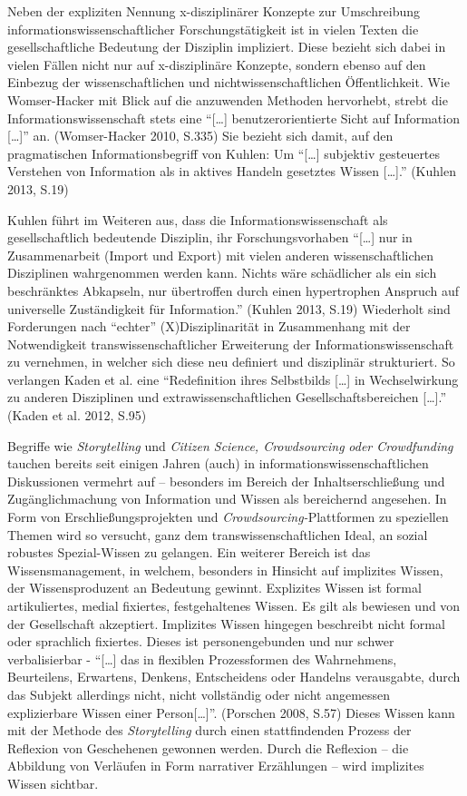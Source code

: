 \documentclass[a4paper,
fontsize=11pt,
oneside,
numbers=noperiodatend,
parskip=half-,
bibliography=totoc,
final
]{scrartcl}
\begin{document}
Neben der expliziten Nennung x-disziplinärer Konzepte zur Umschreibung
informationswissenschaftlicher Forschungstätigkeit ist in vielen Texten
die gesellschaftliche Bedeutung der Disziplin impliziert. Diese bezieht
sich dabei in vielen Fällen nicht nur auf x-disziplinäre Konzepte,
sondern ebenso auf den Einbezug der wissenschaftlichen und
nichtwissenschaftlichen Öffentlichkeit. Wie Womser-Hacker mit Blick auf
die anzuwenden Methoden hervorhebt, strebt die Informationswissenschaft
stets eine \enquote{{[}\ldots{}{]} benutzerorientierte Sicht auf
Information {[}\ldots{}{]}} an. (Womser-Hacker 2010, S.335) Sie bezieht
sich damit, auf den pragmatischen Informationsbegriff von Kuhlen: Um
\enquote{{[}\ldots{}{]} subjektiv gesteuertes Verstehen von Information
als in aktives Handeln gesetztes Wissen {[}\ldots{}{]}.} (Kuhlen 2013,
S.19)

Kuhlen führt im Weiteren aus, dass die Informationswissenschaft als
gesellschaftlich bedeutende Disziplin, ihr Forschungsvorhaben
\enquote{{[}\ldots{}{]} nur in Zusammenarbeit (Import und Export) mit
vielen anderen wissenschaftlichen Disziplinen wahrgenommen werden kann.
Nichts wäre schädlicher als ein sich beschränktes Abkapseln, nur
übertroffen durch einen hypertrophen Anspruch auf universelle
Zuständigkeit für Information.} (Kuhlen 2013, S.19) Wiederholt sind
Forderungen nach \enquote{echter} (X)Disziplinarität in Zusammenhang mit
der Notwendigkeit transwissenschaftlicher Erweiterung der
Informationswissenschaft zu vernehmen, in welcher sich diese neu
definiert und disziplinär strukturiert. So verlangen Kaden et al. eine
\enquote{Redefinition ihres Selbstbilds {[}\ldots{}{]} in Wechselwirkung
zu anderen Disziplinen und extrawissenschaftlichen
Gesellschaftsbereichen {[}\ldots{}{]}.} (Kaden et al. 2012, S.95)

Begriffe wie \emph{Storytelling} und \emph{Citizen Science,
Crowdsourcing} \emph{oder Crowdfunding} tauchen bereits seit einigen
Jahren (auch) in informationswissenschaftlichen Diskussionen vermehrt
auf -- besonders im Bereich der Inhaltserschließung und
Zugänglichmachung von Information und Wissen als bereichernd angesehen.
In Form von Erschließungsprojekten und \emph{Crowdsourcing-}Plattformen
zu speziellen Themen wird so versucht, ganz dem transwissenschaftlichen
Ideal, an sozial robustes Spezial-Wissen zu gelangen. Ein weiterer
Bereich ist das Wissensmanagement, in welchem, besonders in Hinsicht auf
implizites Wissen, der Wissensproduzent an Bedeutung gewinnt. Explizites
Wissen ist formal artikuliertes, medial fixiertes, festgehaltenes
Wissen. Es gilt als bewiesen und von der Gesellschaft akzeptiert.
Implizites Wissen hingegen beschreibt nicht formal oder sprachlich
fixiertes. Dieses ist personengebunden und nur schwer verbalisierbar -
\enquote{{[}\ldots{}{]} das in flexiblen Prozessformen des Wahrnehmens,
Beurteilens, Erwartens, Denkens, Entscheidens oder Handelns verausgabte,
durch das Subjekt allerdings nicht, nicht vollständig oder nicht
angemessen explizierbare Wissen einer Person{[}\ldots{}{]}}. (Porschen
2008, S.57) Dieses Wissen kann mit der Methode des \emph{Storytelling}
durch einen stattfindenden Prozess der Reflexion von Geschehenen
gewonnen werden. Durch die Reflexion -- die Abbildung von Verläufen in
Form narrativer Erzählungen -- wird implizites Wissen sichtbar.
\end{document}
